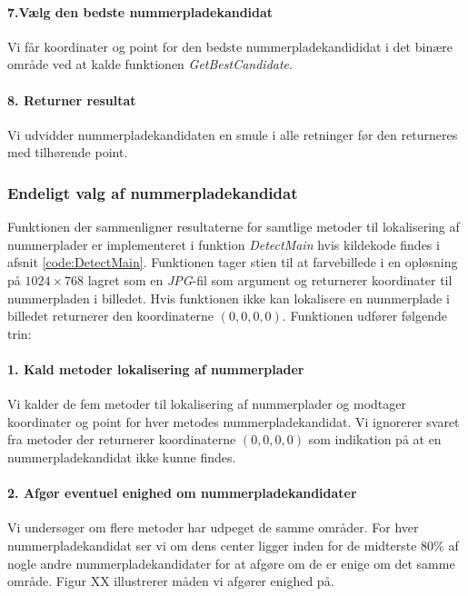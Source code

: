 \paragraph{7.Vælg den bedste nummerpladekandidat}
Vi får koordinater og point for den bedste nummerpladekandididat i det binære område ved at kalde funktionen \textit{GetBestCandidate}. 

\paragraph{8. Returner resultat}
Vi udvidder nummerpladekandidaten en smule i alle retninger før den returneres med tilhørende point.

\subsubsection{Endeligt valg af nummerpladekandidat}
Funktionen der sammenligner resultaterne for samtlige metoder til lokalisering af nummerplader er implementeret i funktion \textit{DetectMain} hvis kildekode findes i afsnit \vref{code:DetectMain}. Funktionen tager stien til at farvebillede i en opløsning på $1024 \times 768$ lagret som en \textit{JPG}-fil som argument og returnerer koordinater til nummerpladen i billedet. Hvis funktionen ikke kan lokalisere en nummerplade i billedet returnerer den koordinaterne $(0,0,0,0)$. Funktionen udfører følgende trin: 

\paragraph{1. Kald metoder lokalisering af nummerplader}
Vi kalder de fem metoder til lokalisering af nummerplader og modtager koordinater og point for hver metodes nummerpladekandidat. Vi ignorerer svaret fra metoder der returnerer koordinaterne $(0,0,0,0)$ som indikation på at en nummerpladekandidat ikke kunne findes.

\paragraph{2. Afgør eventuel enighed om nummerpladekandidater}
Vi undersøger om flere metoder har udpeget de samme områder. For hver nummerpladekandidat ser vi om dens center ligger inden for de midterste 80\% af nogle andre nummerpladekandidater for at afgøre om de er enige om det samme område. Figur XX illustrerer måden vi afgører enighed på.

